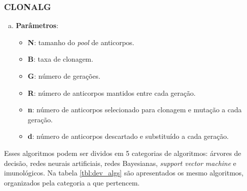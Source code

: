 \subsubsection{CLONALG}

\begin{enumerate}[a)]
    \item \textbf{Parâmetros}:
        \begin{itemize}

            \item \textbf{N}: tamanho do \emph{pool} de anticorpos.

            \item \textbf{B}: taxa de clonagem.

            \item \textbf{G}: número de gerações.

            \item \textbf{R}: número de anticorpos mantidos entre cada geração.

            \item \textbf{n}: número de anticorpos selecionado para clonagem e mutação a cada geração.

            \item \textbf{d}: número de anticorpos descartado e substituído a cada geração.
        \end{itemize}
\end{enumerate}

Esses algoritmos podem ser dividos em 5 categorias de algoritmos: árvores de decisão, redes neurais artificiais, redes Bayesianas, \emph{support vector machine} e imunológicos. Na tabela \ref{tbl:dev_algs} são apresentados os mesmo algoritmos, organizados pela categoria a que pertencem.

